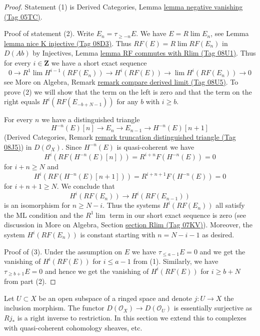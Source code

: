 \documentclass{amsart}
\theoremstyle{plain}
\theoremstyle{definition}
\theoremstyle{remark}
\numberwithin{equation}{subsection}
\def\lim{\mathop{\mathrm{lim}}\nolimits}
\begin{document}
\begin{proof}
Statement (1) is
Derived Categories, Lemma \href{https://stacks.math.columbia.edu/tag/05TC}{lemma negative vanishing (Tag 05TC)}.

\medskip\noindent
Proof of statement (2). Write $E_n = \tau_{\geq -n}E$. We have
$E = R\lim E_n$, see Lemma \href{https://stacks.math.columbia.edu/tag/08D3}{lemma nice K injective (Tag 08D3)}. Thus
$RF(E) = R\lim RF(E_n)$ in $D(\textit{Ab})$ by Injectives, Lemma
\href{https://stacks.math.columbia.edu/tag/08U1}{lemma RF commutes with Rlim (Tag 08U1)}. Thus for every $i \in \mathbf{Z}$
we have a short exact sequence
$$
0 \to R^1\lim H^{i - 1}(RF(E_n)) \to H^i(RF(E)) \to \lim H^i(RF(E_n)) \to 0
$$
see More on Algebra, Remark
\href{https://stacks.math.columbia.edu/tag/08U5}{remark compare derived limit (Tag 08U5)}.
To prove (2) we will show that the term on the left is zero
and that the term on the right equals $H^i(RF(E_{-b + N - 1}))$
for any $b$ with $i \geq b$.

\medskip\noindent
For every $n$ we have a distinguished triangle
$$
H^{-n}(E)[n] \to E_n \to E_{n - 1} \to H^{-n}(E)[n + 1]
$$
(Derived Categories, Remark
\href{https://stacks.math.columbia.edu/tag/08J5}{remark truncation distinguished triangle (Tag 08J5)})
in $D(\mathcal{O}_X)$. Since $H^{-n}(E)$ is quasi-coherent we have
$$
H^i(RF(H^{-n}(E)[n])) = R^{i + n}F(H^{-n}(E)) = 0
$$
for $i + n \geq N$ and
$$
H^i(RF(H^{-n}(E)[n + 1])) = R^{i + n + 1}F(H^{-n}(E)) = 0
$$
for $i + n + 1 \geq N$. We conclude that
$$
H^i(RF(E_n)) \to H^i(RF(E_{n - 1}))
$$
is an isomorphism for $n \geq N - i$. Thus the systems $H^i(RF(E_n))$ all
satisfy the ML condition and the $R^1\lim$ term in our short exact
sequence is zero (see discussion in
More on Algebra, Section \href{https://stacks.math.columbia.edu/tag/07KV}{section Rlim (Tag 07KV)}).
Moreover, the system $H^i(RF(E_n))$ is constant starting
with $n = N - i - 1$ as desired.

\medskip\noindent
Proof of (3). Under the assumption on $E$ we have
$\tau_{\leq a - 1}E = 0$ and we get the vanishing
of $H^i(RF(E))$ for $i \leq a - 1$ from (1).
Similarly, we have $\tau_{\geq b + 1}E = 0$ and hence
we get the vanishing of $H^i(RF(E))$ for $i \geq b + N$ from
part (2).
\end{proof}


\noindent
Let $U \subset X$ be an open subspace of a ringed space
and denote $j : U \to X$ the inclusion morphism. The functor
$D(\mathcal{O}_X) \to D(\mathcal{O}_U)$ is essentially surjective as
$Rj_*$ is a right inverse to restriction.
In this section we extend this to complexes with quasi-coherent cohomology
sheaves, etc.
\end{document}
